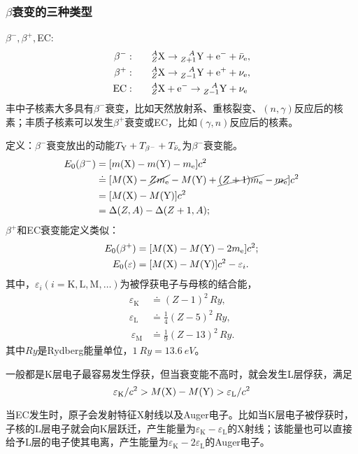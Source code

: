 \subsubsection[\textit{\textbeta}衰变的三种类型]{$\beta$衰变的三种类型}
$\beta^-,\beta^+,$EC:
\begin{align}
	\beta^-:&\qquad{^A_Z\mathrm{X}} \to {^{\quad\!A}_{Z+1}\mathrm{Y}} + \mathrm e^- + \bar\nu_\mathrm e,\\
	\beta^+:&\qquad{^A_Z\mathrm{X}} \to {^{\quad\!A}_{Z-1}\mathrm{Y}} + \mathrm e^+ + \nu_\mathrm e,\\
	\mathrm{EC}:&\qquad{^A_Z\mathrm{X}} + \mathrm e^- \to {^{\quad\!A}_{Z-1}\mathrm{Y}} + \nu_\mathrm e
\end{align}
丰中子核素大多具有$\beta^-$衰变，比如天然放射系、重核裂变、$(n,\gamma)$反应后的核素；丰质子核素可以发生$\beta^+$衰变或EC，比如$(\gamma,n)$反应后的核素。

定义：$\beta^-$衰变放出的动能$T_{\mathrm{Y}}+T_{\beta^-}+T_{\bar\nu_\mathrm e}$为$\beta^-$衰变能。
\begin{align}\notag
	E_0(\beta^-)&=[m(\mathrm{X})-m(\mathrm{Y})-m_\mathrm e]c^2\\\notag
	&\doteq[M(\mathrm{X})-\cancel{Zm_\mathrm e}-M(\mathrm{Y})+\cancel{(Z+1)m_\mathrm e}-\cancel{m_\mathrm e}]c^2\\
	&=[M(\mathrm{X})-M(\mathrm{Y})]c^2\\\notag
	&=\Delta(Z,A)-\Delta(Z+1,A);
\end{align}
$\beta^+$和EC衰变能定义类似：
\begin{align}
	E_0(\beta^+)&=[M(\mathrm{X})-M(\mathrm{Y})-2m_\mathrm e]c^2;\\
	E_0(\varepsilon)&=[M(\mathrm{X})-M(\mathrm{Y})]c^2-\varepsilon_i.
\end{align}
其中，$\varepsilon_i(i=\mathrm{K,L,M,}\ldots)$为被俘获电子与母核的结合能，
\begin{align*}
	\varepsilon_{\mathrm K}&\doteq(Z-1)^2\,\si{Ry},\\
	\varepsilon_{\mathrm L}&\doteq\frac14(Z-5)^2\,\si{Ry},\\\
	\varepsilon_{\mathrm M}&\doteq\frac19(Z-13)^2\,\si{Ry}.
\end{align*}
其中$\si{Ry}$是Rydberg能量单位，$\SI{1}{Ry}=\SI{13.6}{eV}$。

一般都是K层电子最容易发生俘获，但当衰变能不高时，就会发生L层俘获，满足
\[
	\varepsilon_\mathrm K / c^2 > M(\mathrm{X})-M(\mathrm{Y}) > \varepsilon_\mathrm L / c^2
\]

当EC发生时，原子会发射特征X射线以及Auger电子。比如当K层电子被俘获时，子核的L层电子就会向K层跃迁，产生能量为$\varepsilon_\mathrm K - \varepsilon_\mathrm L$的X射线；该能量也可以直接给予L层的电子使其电离，产生能量为$\varepsilon_\mathrm K - 2\varepsilon_{\mathrm L}$的Auger电子。

